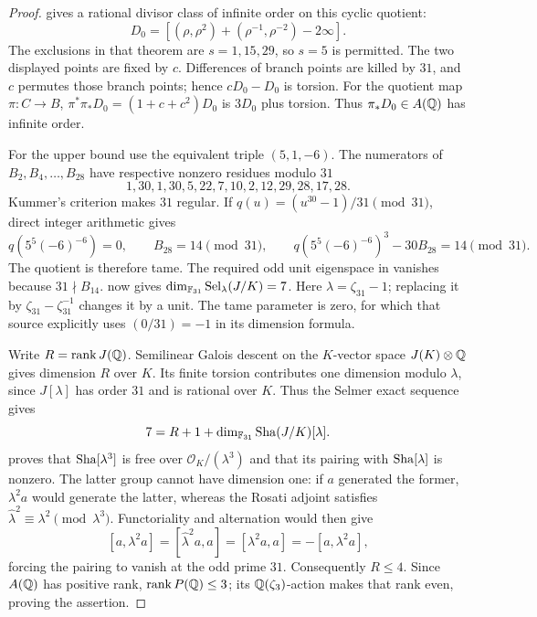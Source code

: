 \begin{proof}
\citet[Theorem~2.1, pp.~208--209]{GrossRohrlich1978} gives a
rational divisor class of infinite order on this cyclic quotient:
\[
 D_0=[(\rho,\rho^2)+(\rho^{-1},\rho^{-2})-2\infty].
\]
The exclusions in that theorem are $s=1,15,29$, so $s=5$ is
permitted. The two displayed points are fixed by $c$.
Differences of branch points are killed by $31$, and $c$
permutes those branch points; hence $cD_0-D_0$ is torsion.
For the quotient map $\pi:C\to B$,
$\pi^*\pi_*D_0=(1+c+c^2)D_0$ is $3D_0$ plus torsion.
Thus $\pi_*D_0\in A(\mathbb Q)$ has infinite order.

For the upper bound use the equivalent triple $(5,1,-6)$.
The numerators of $B_2,B_4,\ldots,B_{28}$ have respective
nonzero residues modulo $31$
\[
 1,30,1,30,5,22,7,10,2,12,29,28,17,28.
\]
Kummer's criterion makes $31$ regular. If
$q(u)=(u^{30}-1)/31\pmod{31}$, direct integer arithmetic gives
\[
 q(5^5(-6)^{-6})=0,\qquad B_{28}=14\pmod{31},\qquad
 q(5^5(-6)^{-6})^3-30B_{28}=14\pmod{31}.
\]
The quotient is therefore tame. The required odd unit eigenspace
in \citet[Theorem~1.2 and the following criterion]{McCallumTzermias2004}
vanishes because $31\nmid B_{14}$.
\citet[Theorems~4.16--4.17 and Corollary~4.18, author
pp.~35--36]{ShuExpanded2021} now gives
$\dim_{\mathbb F_{31}}\operatorname{Sel}_\lambda(J/K)=7$.
Here $\lambda=\zeta_{31}-1$; replacing it by
$\zeta_{31}-\zeta_{31}^{-1}$ changes it by a unit.
The tame parameter is zero, for which that source explicitly uses
$(0/31)=-1$ in its dimension formula.

Write $R=\operatorname{rank}J(\mathbb Q)$. Semilinear Galois descent
on the $K$-vector space $J(K)\otimes\mathbb Q$ gives dimension $R$
over $K$. Its finite torsion contributes one dimension modulo
$\lambda$, since $J[\lambda]$ has order $31$ and is rational
over $K$. Thus the Selmer exact sequence gives
\[
 7=R+1+\dim_{\mathbb F_{31}}\operatorname{Sha}(J/K)[\lambda].
\]
\citet[Theorems~1.2 and 1.4; Proposition~5.1]{McCallumTzermias2004}
proves that $\operatorname{Sha}[\lambda^3]$ is free over
$\mathcal O_K/(\lambda^3)$ and that its pairing with
$\operatorname{Sha}[\lambda]$ is nonzero. The latter group cannot have
dimension one: if $a$ generated the former, $\lambda^2a$
would generate the latter, whereas the Rosati adjoint satisfies
$\widehat\lambda^2\equiv\lambda^2\pmod{\lambda^3}$.
Functoriality and alternation would then give
\[
 [a,\lambda^2a]=[\widehat\lambda^2a,a]
              =[\lambda^2a,a]=-[a,\lambda^2a],
\]
forcing the pairing to vanish at the odd prime $31$.
Consequently $R\le4$. Since $A(\mathbb Q)$ has positive rank,
$\operatorname{rank}P(\mathbb Q)\le3$; its $\mathbb Q(\zeta_3)$-action
makes that rank even, proving the assertion.
\end{proof}

